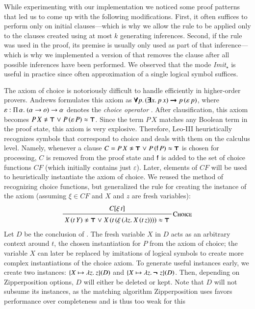 While experimenting with our implementation we noticed some proof patterns that
led us to come up with the following modifications. First, it often suffices to
perform  only on initial clauses---which is why we allow the rule to
be applied only to the clauses created using at most $k$ generating inferences.
Second, if the rule was used in the proof, its premise is usually only used as
part of that inference---which is why we implemented a version of 
that removes the clause after all possible  inferences have been
performed. We observed that the mode \emph{Imit}$_\star$ is useful in practice
since often approximation of a single logical symbol suffices.

The axiom of choice is notoriously difficult to handle efficiently in higher-order provers. Andrews formulates
this axiom as $\pmb{\forall} p.\, (\pmb{\exists}
x.\, p \, x) \pmb{\rightarrow} p \, (\varepsilon \, p)$, where $\varepsilon :
\Pi\,\alpha.\;(\alpha \rightarrow o) \rightarrow \alpha$ denotes the \emph{choice
operator} \cite{pa-01-classical-ty-thy}. After clausification, this axiom becomes $P \, X \noteq \itrue \llor P
\, (\varepsilon \, P) \eq \itrue$. Since the term $P \, X$ matches any Boolean
term in the proof state, this axiom is very explosive. Therefore, Leo-III
\cite{sb-21-leo3} heuristically recognizes symbols that correspond to choice and deals with
them on the calculus level. Namely, whenever a clause $C = P \, X \noteq \itrue \llor P \, (\cst{f} \,
P) \eq \itrue$ is chosen for processing, $C$ is removed from the proof state and $\mathsf{f}$ is
added to the set of choice functions $\mathit{CF}$ (which initially contains just
$\varepsilon$). Later, elements of $\mathit{CF}$ will be used to heuristically
instantiate the axiom of choice. We reused the method of recognizing choice
functions, but generalized the rule for creating the instance of
the axiom (assuming $\xi \in \mathit{CF}$ and $X$ and $z$ are fresh variables):
%
$$\namedinference{Choice}
               {C[\xi \, t]}
               { X \, (t \, Y) \noteq \itrue \llor X \, (t \, (\xi \, (\lam{z}{X \, (t \, z)})) ) \eq \itrue }$$
%
Let $D$ be the conclusion of . The fresh variable $X$ in $D$ acts as
an arbitrary context around $t$, the chosen instantiation for $P$ from the axiom of choice;
the variable $X$ can later be replaced by imitations of logical symbols to create more
complex instantiations of the choice axiom. To generate useful instances early, we create two instances: $\{X
\mapsto \lambda z.\> z\}(D)$ and $\{X \mapsto \lambda z.\> \pmb{\neg\,}\, z\}(D)$. Then, depending on
Zipperposition options, $D$ will either be deleted or kept. Note that $D$
will not subsume its instances, as the matching algorithm Zipperposition uses favors performance over completeness and is
thus too weak for this \cite[Sect.~6]{bbtvw-21-sup-lam}

